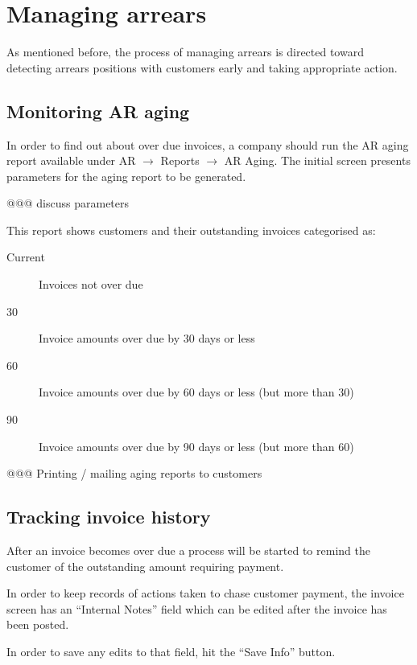 \section{Managing arrears}
\label{sec-workflows-credit-risk-managing-arrears}

As mentioned before, the process of managing arrears is directed toward
detecting arrears positions with customers early and taking appropriate
action.


\subsection{Monitoring AR aging}
\label{subsec-workflows-credit-risk-monitoring-arrears}

In order to find out about over due invoices, a company should run the AR
aging report available under AR $\rightarrow$ Reports $\rightarrow$ AR Aging.
The initial screen presents parameters for the aging report to be generated.

@@@ discuss parameters

This report shows customers and their outstanding invoices categorised as:

\begin{description}
\item [Current] Invoices not over due
\item [30] Invoice amounts over due by 30 days or less
\item [60] Invoice amounts over due by 60 days or less (but more than 30)
\item [90] Invoice amounts over due by 90 days or less (but more than 60)
\end{description}


@@@ Printing / mailing aging reports to customers


\subsection{Tracking invoice history}
\label{subsec-workflows-credit-risk-arrears-reminding}

After an invoice becomes over due a process will be started to remind
the customer of the outstanding amount requiring payment.

In order to keep records of actions taken to chase customer payment,
the invoice screen has an ``Internal Notes'' field which can be edited
after the invoice has been posted.

In order to save any edits to that field, hit the ``Save Info'' button.

